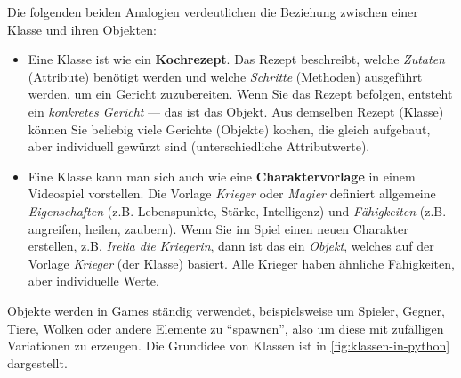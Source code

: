 Die folgenden beiden Analogien verdeutlichen die Beziehung zwischen einer Klasse und ihren Objekten:
\begin{itemize}
	\item Eine Klasse ist wie ein \textbf{Kochrezept}. Das Rezept beschreibt, welche \textit{Zutaten} (Attribute) benötigt werden und welche \textit{Schritte} (Methoden) ausgeführt werden, um ein Gericht zuzubereiten. Wenn Sie das Rezept befolgen, entsteht ein \textit{konkretes Gericht} — das ist das Objekt. Aus demselben Rezept (Klasse) können Sie beliebig viele Gerichte (Objekte) kochen, die gleich aufgebaut, aber individuell gewürzt sind (unterschiedliche Attributwerte).
	
	\item Eine Klasse kann man sich auch wie eine \textbf{Charaktervorlage} in einem Videospiel vorstellen. Die Vorlage \textit{Krieger} oder \textit{Magier} definiert allgemeine \textit{Eigenschaften} (z.B. Lebenspunkte, Stärke, Intelligenz) und \textit{Fähigkeiten} (z.B. angreifen, heilen, zaubern). Wenn Sie im Spiel einen neuen Charakter erstellen, z.B. \textit{Irelia die Kriegerin}, dann ist das ein \textit{Objekt}, welches auf der Vorlage \textit{Krieger} (der Klasse) basiert. Alle Krieger haben ähnliche Fähigkeiten, aber individuelle Werte.
\end{itemize}

Objekte werden in Games ständig verwendet, beispielsweise um Spieler, Gegner, Tiere, Wolken oder andere Elemente zu \enquote{spawnen}, also um diese mit zufälligen Variationen zu erzeugen. Die Grundidee von Klassen ist in \cref{fig:klassen-in-python} dargestellt.

